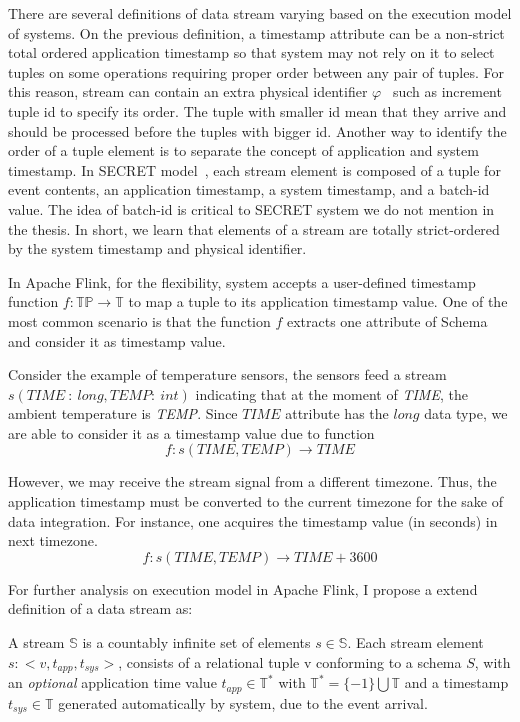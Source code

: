 There are several definitions of data stream varying based on the execution model of systems. On the previous definition, a timestamp attribute can be a non-strict total ordered application timestamp so that system may not rely on it to select tuples on some operations requiring proper order between any pair of tuples. For this reason, stream can contain an extra physical identifier  $\varphi$~\citep{Petit:2010} such as increment tuple id to specify its order. The tuple with smaller id mean that they arrive and should be processed before the tuples with bigger id. Another way to identify the order of a tuple element is to separate the concept of application and system timestamp. In SECRET model~\citep{Dindar:2013}, each stream element is composed of a tuple for event contents, an application timestamp, a system timestamp, and a batch-id value. The idea of batch-id is critical to SECRET system we do not mention in the thesis.
In short, we learn that elements of a stream are totally strict-ordered by the system timestamp and physical identifier.

In Apache Flink, for the flexibility, system accepts a user-defined timestamp function   $f: \mathbb{TP} \rightarrow \mathbb{T}$ to map a tuple to its application timestamp value. One of the most common scenario is that the function $f$ extracts one attribute of Schema and consider it as timestamp value.

Consider the example of temperature sensors, the sensors feed a stream $s(TIME\ :\ long,TEMP:\ int)$ indicating that at the moment of \textit{TIME}, the ambient temperature is \textit{TEMP}. Since $TIME$ attribute has the $long$ data type, we are able to consider it as a timestamp value due to function
\begin{equation}
f: s(TIME, TEMP) \rightarrow TIME
\end{equation}

However, we may receive the stream signal from a different timezone. Thus, the application timestamp must be converted to the current timezone for the sake of data integration. For instance, one acquires the timestamp value (in seconds) in next timezone.
\begin{equation}
f: s(TIME, TEMP) \rightarrow TIME + 3600
\end{equation}


For further analysis on execution model in Apache Flink, I propose a extend definition of a data stream as:
\begin{defi}
	A stream $\mathbb{S}$ is a countably infinite set of elements $s \in \mathbb{S}$. Each  stream element $s: <v, t_{app}, t_{sys}>$, consists of a relational tuple v conforming to a schema $S$, with an \textit{optional} application time value $t_{app} \in \mathbb{T}^*$ with $\mathbb{T}^* = \{-1\} \bigcup \mathbb{T}$ and a timestamp $t_{sys} \in \mathbb{T}$ generated automatically by system, due to the event arrival.
\end{defi}

